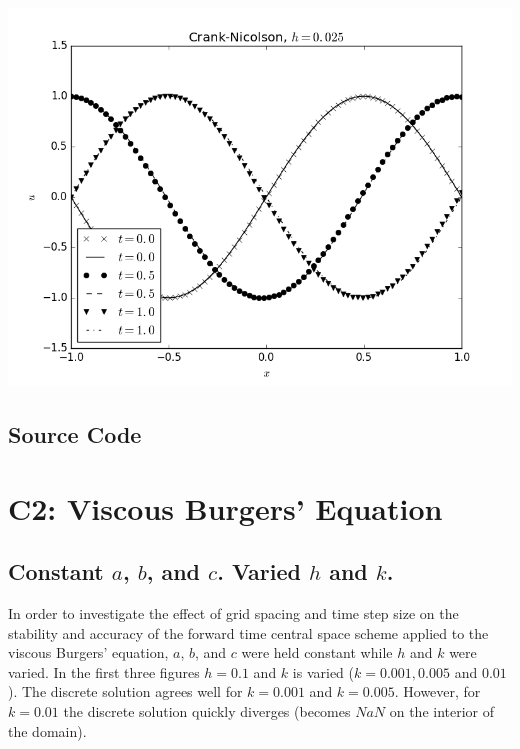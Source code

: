 \documentclass[a4paper,10pt]{article}
\newcommand{\fw}{\linewidth}
\begin{document}
{      \vspace{0.25in}
      \includegraphics[width=\fw]{cn_thomas_M-80}
      \vspace{0.25in}
    }
		
	\subsection{Source Code}
	
	
	
	\section{C2: Viscous Burgers' Equation} \label{sec:c2}
	
	\subsection{Constant $a$, $b$, and $c$. Varied $h$ and $k$.}
	
	In order to investigate the effect of grid spacing and time step size on the stability and accuracy of the forward time central space scheme applied to the viscous Burgers' equation, $a$, $b$, and $c$ were held constant while $h$ and $k$ were varied.
	In the first three figures $h = 0.1$ and $k$ is varied ($k = 0.001, 0.005$ and $0.01$).
	The discrete solution agrees well for $k = 0.001$ and $k = 0.005$.
	However, for $k = 0.01$ the discrete solution quickly diverges (becomes $NaN$ on the interior of the domain).
	
\end{document}
